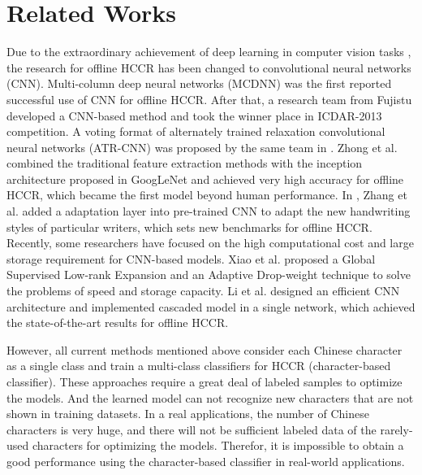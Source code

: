 \documentclass[conference]{IEEEtran}
\begin{document}
\section{Related Works}
\label{Related Works}
Due to the extraordinary achievement of deep learning in computer vision tasks\cite{krizhevsky2012imagenet,simonyan2015very,szegedy2015going,he2016deep} , the research for offline HCCR has been changed to convolutional neural networks (CNN). 
Multi-column deep neural networks (MCDNN)\cite{ciregan2012multi-column}\cite{ciresan2015multi-column} was the first reported successful use of CNN for offline HCCR. After that, a research team from Fujistu developed a CNN-based method and took the winner place in ICDAR-2013 competition\cite{yin2013icdar}. A voting format of alternately trained relaxation convolutional neural networks (ATR-CNN) was proposed by the same team in \cite{wu2014handwritten}. Zhong et al.\cite{zhong2015high} combined the traditional feature extraction methods with the inception architecture proposed in GoogLeNet\cite{szegedy2015going} and achieved very high accuracy for offline HCCR, which became the first model beyond human performance. In \cite{zhang2017online}, Zhang et al. added a adaptation layer into pre-trained CNN to adapt the new handwriting styles of particular writers, which sets new benchmarks for offline HCCR. 
Recently, some researchers have focused on the high computational cost and large storage requirement for CNN-based models.
 Xiao et al.\cite{xiao2017building} proposed a Global Supervised Low-rank Expansion and an Adaptive Drop-weight technique to solve
 the problems of speed and storage capacity. Li et al.\cite{li2018building} designed an efficient CNN architecture and implemented cascaded model in a single network, which achieved the state-of-the-art results for offline HCCR.

However, all current methods mentioned above consider each Chinese character as a single class and train a multi-class classifiers for HCCR (character-based classifier). These approaches require a great deal of labeled samples to optimize the models. And the learned model can not recognize new characters that are not shown in training datasets. In a real applications, the number of Chinese characters is very huge, and there will not be sufficient labeled data of the rarely-used characters for optimizing the models. Therefor, it is impossible to obtain a good performance using the character-based classifier in real-world applications.
\end{document}
